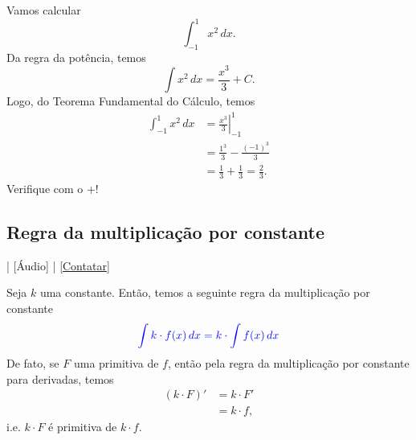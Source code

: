 \begin{ex}
  Vamos calcular
  \begin{equation}
    \int_{-1}^1 x^2\,dx.
  \end{equation}
  Da regra da potência, temos
  \begin{equation}
    \int x^2\,dx = \frac{x^3}{3} + C.
  \end{equation}
  Logo, do Teorema Fundamental do Cálculo, temos
  \begin{align}
    \int_{-1}^1 x^2\,dx &= \left.\frac{x^3}{3}\right|_{-1}^1 \\
                        &= \frac{1^3}{3} - \frac{(-1)^3}{3} \\
                        &= \frac{1}{3} + \frac{1}{3} = \frac{2}{3}.
  \end{align}
    \ifispython
    Verifique com o {\python}+{\sympy}!
    \fi
\end{ex}

\subsection{Regra da multiplicação por constante}

\begin{flushright}
  [Vídeo] | [Áudio] | \href{https://phkonzen.github.io/notas/contato.html}{[Contatar]}
\end{flushright}

Seja $k$ uma constante. Então, temos a seguinte regra da multiplicação por constante
\begin{equation}
  {\color{blue}\int k\cdot f(x)\,dx = k\cdot \int f(x)\,dx}
\end{equation}
De fato, se $F$ uma primitiva de $f$, então pela regra da multiplicação por constante para derivadas, temos
\begin{align}
  (k\cdot F)' &= k\cdot F'\\
              &= k\cdot f,
\end{align}
i.e. $k\cdot F$ é primitiva de $k\cdot f$.

